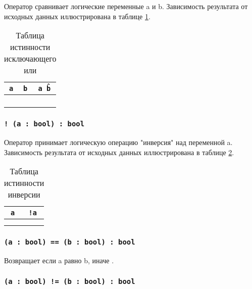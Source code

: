 Оператор сравнивает логические переменные a и b. Зависимость результата от исходных данных иллюстрирована в таблице \ref{logdifftable}.

\begin{table}[htb]
	\caption{Таблица истинности исключающего или}
	\label{logdifftable}
	\begin{tabular}{|c|c|c|}
		\hline
		\texttt{a} & \texttt{b} & \texttt{a \^ b} \\ \hline
		\false{} & \false{} & \false{}  	\\ \hline
		\false{} & \true{}  & \true{}   	\\ \hline
		\true{}  & \false{} & \true{}  		\\ \hline
		\true{}  & \true{}  & \false{}  	\\ \hline
	\end{tabular}
	\vspace{-2em}
\end{table}

\subsubsection{\texttt{! (a : bool) : bool}}

Оператор принимает логическую операцию "инверсия" над переменной a. Зависимость результата от исходных данных иллюстрирована в таблице \ref{invtable}.

\begin{table}[htb]
	\caption{Таблица истинности инверсии}
	\label{invtable}
	\begin{tabular}{|c|c|}
		\hline
		\texttt{a} & \texttt{!a} \\ \hline
		\false{} & \true{} 	 \\ \hline
		\true{}  & \false{}  \\ \hline
	\end{tabular}
	\vspace{-2em}
\end{table}

\subsubsection{\texttt{(a : bool) == (b : bool) : bool}}

Возвращает \true{} если a равно b, иначе \false{}.

\subsubsection{\texttt{(a : bool) != (b : bool) : bool}}

